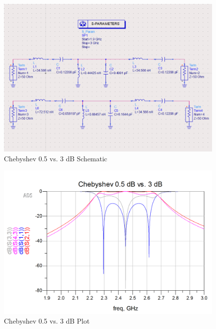 \documentclass{article}
\begin{document}
\begin{figure}[h!]
    \centering
    \includegraphics[scale=0.4]{images/chebyshev_0pt5_vs_3pt0_schematic.png}
    \caption{Chebyshev 0.5 vs. 3 dB Schematic}
    \label{fig:16}
\end{figure}
\begin{figure}[h!]
    \centering
    \includegraphics[scale=0.3]{images/chebyshev_0pt5_vs_3pt0_plot.png}
    \caption{Chebyshev 0.5 vs. 3 dB Plot}
    \label{fig:17}
\end{figure}
\end{document}
